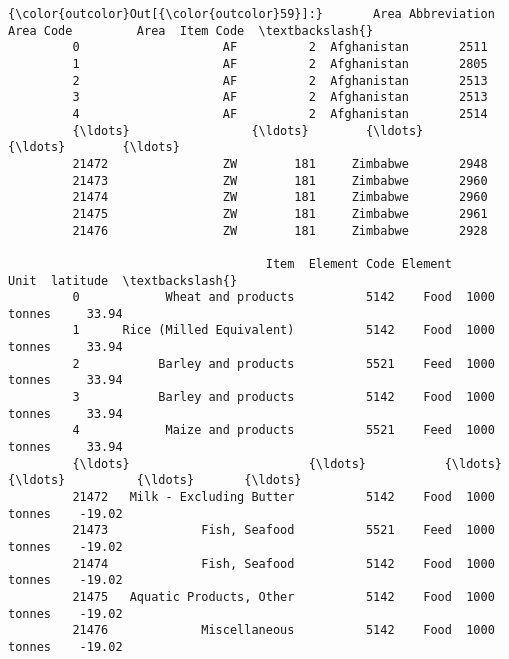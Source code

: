 \documentclass[11pt]{article}
\begin{document}
\begin{Verbatim}[commandchars=\\\{\}]
{\color{outcolor}Out[{\color{outcolor}59}]:}       Area Abbreviation  Area Code         Area  Item Code  \textbackslash{}
         0                    AF          2  Afghanistan       2511   
         1                    AF          2  Afghanistan       2805   
         2                    AF          2  Afghanistan       2513   
         3                    AF          2  Afghanistan       2513   
         4                    AF          2  Afghanistan       2514   
         {\ldots}                 {\ldots}        {\ldots}          {\ldots}        {\ldots}   
         21472                ZW        181     Zimbabwe       2948   
         21473                ZW        181     Zimbabwe       2960   
         21474                ZW        181     Zimbabwe       2960   
         21475                ZW        181     Zimbabwe       2961   
         21476                ZW        181     Zimbabwe       2928   
         
                                    Item  Element Code Element         Unit  latitude  \textbackslash{}
         0            Wheat and products          5142    Food  1000 tonnes     33.94   
         1      Rice (Milled Equivalent)          5142    Food  1000 tonnes     33.94   
         2           Barley and products          5521    Feed  1000 tonnes     33.94   
         3           Barley and products          5142    Food  1000 tonnes     33.94   
         4            Maize and products          5521    Feed  1000 tonnes     33.94   
         {\ldots}                         {\ldots}           {\ldots}     {\ldots}          {\ldots}       {\ldots}   
         21472   Milk - Excluding Butter          5142    Food  1000 tonnes    -19.02   
         21473             Fish, Seafood          5521    Feed  1000 tonnes    -19.02   
         21474             Fish, Seafood          5142    Food  1000 tonnes    -19.02   
         21475   Aquatic Products, Other          5142    Food  1000 tonnes    -19.02   
         21476             Miscellaneous          5142    Food  1000 tonnes    -19.02   
         

\end{Verbatim}
\end{document}
